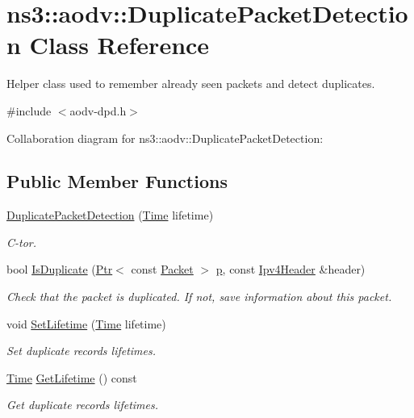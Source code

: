\hypertarget{classns3_1_1aodv_1_1DuplicatePacketDetection}{}\section{ns3\+:\+:aodv\+:\+:Duplicate\+Packet\+Detection Class Reference}
\label{classns3_1_1aodv_1_1DuplicatePacketDetection}


Helper class used to remember already seen packets and detect duplicates.  




{\ttfamily \#include $<$aodv-\/dpd.\+h$>$}



Collaboration diagram for ns3\+:\+:aodv\+:\+:Duplicate\+Packet\+Detection\+:
\subsection*{Public Member Functions}
\begin{DoxyCompactItemize}
\item 
\hyperlink{classns3_1_1aodv_1_1DuplicatePacketDetection_a5231131a90a534254cbaddb06173551f}{Duplicate\+Packet\+Detection} (\hyperlink{classns3_1_1Time}{Time} lifetime)
\begin{DoxyCompactList}\small\item\em C-\/tor. \end{DoxyCompactList}\item 
bool \hyperlink{classns3_1_1aodv_1_1DuplicatePacketDetection_a997ef453692de951dad7485215985a6b}{Is\+Duplicate} (\hyperlink{classns3_1_1Ptr}{Ptr}$<$ const \hyperlink{classns3_1_1Packet}{Packet} $>$ \hyperlink{lte__link__budget__x2__handover__measures_8m_ac9de518908a968428863f829398a4e62}{p}, const \hyperlink{classns3_1_1Ipv4Header}{Ipv4\+Header} \&header)
\begin{DoxyCompactList}\small\item\em Check that the packet is duplicated. If not, save information about this packet. \end{DoxyCompactList}\item 
void \hyperlink{classns3_1_1aodv_1_1DuplicatePacketDetection_af5eb50917d8a82a180e6458278c5f9b4}{Set\+Lifetime} (\hyperlink{classns3_1_1Time}{Time} lifetime)
\begin{DoxyCompactList}\small\item\em Set duplicate records lifetimes. \end{DoxyCompactList}\item 
\hyperlink{classns3_1_1Time}{Time} \hyperlink{classns3_1_1aodv_1_1DuplicatePacketDetection_a3d959b1993384377be75a17101301e27}{Get\+Lifetime} () const 
\begin{DoxyCompactList}\small\item\em Get duplicate records lifetimes. \end{DoxyCompactList}\end{DoxyCompactItemize}

